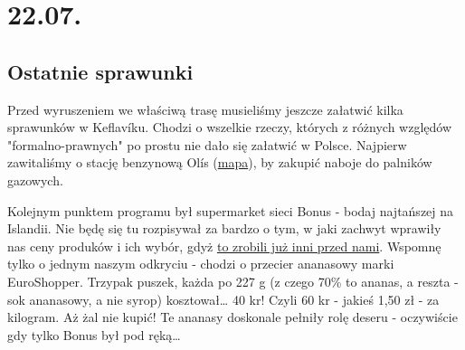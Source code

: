 \chapter*{22.07.}

\section*{Ostatnie sprawunki}

\indent Przed wyruszeniem we właściwą trasę musieliśmy jeszcze załatwić kilka sprawunków w Keflavíku. Chodzi o wszelkie rzeczy, których z różnych względów "formalno-prawnych" po prostu nie dało się załatwić w Polsce.
Najpierw zawitaliśmy o stację benzynową Olís (\href{https://www.google.com/url?q=https\%3A\%2F\%2Fmaps.google.com\%2Fmaps\%3Fq\%3D63.979816\%2C-22.54672}{mapa}), by zakupić naboje do palników gazowych.



Kolejnym punktem programu był supermarket sieci Bonus - bodaj najtańszej na Islandii. Nie będę się tu rozpisywał za bardzo o tym, w jaki zachwyt wprawiły nas ceny produków i ich wybór, gdyż \href{http://www.roboppy.net/food/2009/04/iceland-day-1-part-ii-reykjavik-bonus-supermarket-skyr.html}{to zrobili już inni przed nami}. Wspomnę tylko o jednym naszym odkryciu - chodzi o przecier ananasowy marki EuroShopper. Trzypak puszek, każda po 227 g (z czego 70\% to ananas, a reszta - sok ananasowy, a nie syrop) kosztował… 40 kr! Czyli 60 kr - jakieś 1,50 zł - za kilogram. Aż żal nie kupić! Te ananasy doskonale pełniły rolę deseru - oczywiście gdy tylko Bonus był pod ręką…



